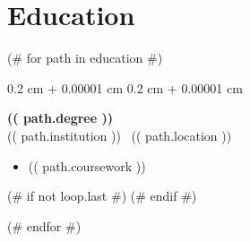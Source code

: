 \documentclass[10pt, letterpaper]{article}
\newenvironment{highlights}{
    \begin{itemize}[
        topsep=0.10 cm,
        parsep=0.10 cm,
        partopsep=0pt,
        itemsep=0pt,
        leftmargin=0.4 cm + 10pt
    ]
}{
    \end{itemize}
} %
\newenvironment{onecolentry}{
    \begin{adjustwidth}{
        0.2 cm + 0.00001 cm
    }{
        0.2 cm + 0.00001 cm
    }
}{
    \end{adjustwidth}
} %
\begin{document}
        \vspace{0.2 cm}

    \section{Education}

        (# for path in education #)

            \begin{onecolentry}
                \textbf{(( path.degree ))} \\
                (( path.institution )) \textbar\ (( path.location )) 
                \begin{highlights}
                    \item (( path.coursework ))
                \end{highlights}
            \end{onecolentry}
        
        (# if not loop.last #)
            \vspace{0.2 cm}
        (# endif #)

        (# endfor #)
\end{document}
